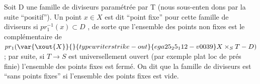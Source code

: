 Soit D une famille de diviseurs  paramétrée par T (nous sous-enten%
dons par la suite ``positif''). Un point $x\in X$ est dit ``point fixe'' pour
cette famille de diviseurs si $pr_1^{-1}(x)\subset D$ , de sorte que l'ensemble des
points non fixes est le complémentaire de $pr_1(\var{\xout{X}}{}{typewriter strike-out}{ega25_25_112-v0039}X\times_S T - D)$; par suite, si
$T\longrightarrow S$ est universellement ouvert (par exemple plat loc de prés finie)
l'ensemble des points fixes est fermé. On dit que la famille de diviseurs
est ``sans points fixes'' si l'ensemble  des points fixes est vide.

